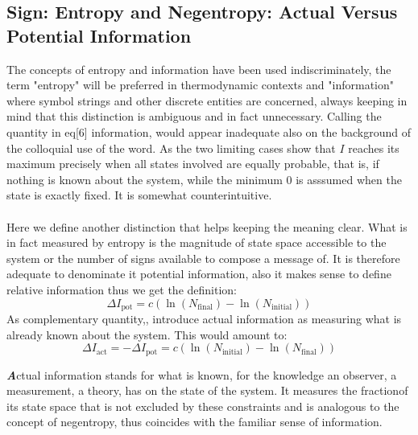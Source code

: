 \documentclass[9pt,a4paper, twocolumn]{article}
\newcounter{theo}
\newenvironment{callout}
	{\begin{calloutbox}\color{charcoal}\textbf\textit}
	{\end{calloutbox}}
\begin{document}
        \subsection{Sign: Entropy and Negentropy: Actual Versus Potential Information}
            The concepts of entropy and information have been used indiscriminately, the term "entropy" will be preferred in thermodynamic contexts and "information" where symbol strings and other discrete entities are concerned, always keeping in mind that this distinction is ambiguous and in fact unnecessary. Calling the quantity in eq[6] information, would appear inadequate also on the background of the colloquial use of the word. As the two limiting cases show that $I$ reaches its maximum precisely when all states involved are equally probable, that is, if nothing is known about the system, while the minimum $0$ is asssumed when the state is exactly fixed. It is somewhat counterintuitive.
            \\
            \\
            Here we define another distinction that helps keeping the meaning clear. What is in fact measured by entropy is the magnitude of state space accessible to the system or the number of signs available to compose a message of. It is therefore adequate to denominate it potential information, also it makes sense to define relative information thus we get the definition:
            \begin{equation}
                \Delta I_{\text{pot}} = c\left(\ln(N_{\text{final}}) - \ln(N_{\text{initial}})\right)
            \end{equation}
            As complementary quantity,, introduce actual information as measuring what is already known about the system. This would amount to:
            \begin{equation}
                \Delta I_{\text{act}} = -    \Delta I_{\text{pot}} = c\left(\ln(N_{\text{initial}}) - \ln(N_{\text{final}})\right)
            \end{equation}
            \begin{callout}
                Actual information stands for what is known, for the knowledge an observer, a measurement, a theory, has on the state of the system. It measures the fractionof its state space that is not excluded by these constraints and is analogous to the concept of negentropy, thus coincides with the familiar sense of information.    
            \end{callout}
\end{document}
